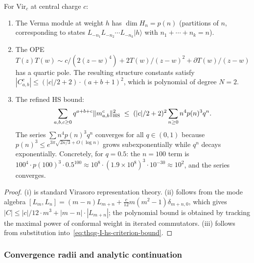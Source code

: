 \begin{proposition}
\label{prop:thqg-I-virasoro-detail}
For $\mathrm{Vir}_c$ at central charge $c$:
\begin{enumerate}[label=\textup{(\roman*)}]
\item The Verma module at weight $h$ has $\dim H_n = p(n)$ (partitions of $n$, corresponding to states $L_{-n_1}L_{-n_2}\cdots L_{-n_k}|h\rangle$ with $n_1 + \cdots + n_k = n$).
\item The OPE $T(z)T(w) \sim c/(2(z-w)^4) + 2T(w)/(z-w)^2 + \partial T(w)/(z-w)$ has a quartic pole. The resulting structure constants satisfy $|C^c_{a,b}| \leq (|c|/2 + 2) \cdot (a+b+1)^2$, which is polynomial of degree $N = 2$.
\item The refined HS bound:
 \begin{equation}\label{eq:thqg-I-virasoro-refined-hs}
 \sum_{a,b,c \geq 0} q^{a+b+c} \|m^c_{a,b}\|_{\operatorname{HS}}^2 \;\leq\; (|c|/2 + 2)^2 \sum_{n \geq 0} n^4 p(n)^3 q^n.
 \end{equation}
 The series $\sum n^4 p(n)^3 q^n$ converges for all $q \in (0,1)$ because $p(n)^3 \leq e^{3\pi\sqrt{2n/3} + O(\log n)}$ grows subexponentially while $q^n$ decays exponentially. Concretely, for $q = 0.5$: the $n = 100$ term is $100^4 \cdot p(100)^3 \cdot 0.5^{100} \approx 10^8 \cdot (1.9 \times 10^8)^3 \cdot 10^{-30} \approx 10^{2}$, and the series converges.
\end{enumerate}
\end{proposition}

\begin{proof}
(i) is standard Virasoro representation theory. (ii) follows from the mode algebra $[L_m, L_n] = (m-n)L_{m+n} + \frac{c}{12}m(m^2-1)\delta_{m+n,0}$, which gives $|C| \leq |c|/12 \cdot m^3 + |m-n| \cdot |L_{m+n}|$; the polynomial bound is obtained by tracking the maximal power of conformal weight in iterated commutators. (iii) follows from substitution into~\eqref{eq:thqg-I-hs-criterion-bound}.
\end{proof}

\subsubsection{Convergence radii and analytic continuation}


